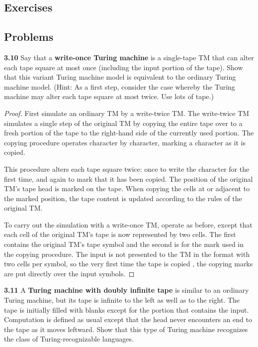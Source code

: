 \subsection{Exercises}

\subsection{Problems}
\textbf{3.10} Say that a \textbf{write-once Turing machine} is a single-tape TM that can alter each tape square at most once (including the input portion of the tape). Show that this variant Turing machine model is equivalent to the ordinary Turing machine model. (Hint: As a first step, consider the case whereby the Turing machine may alter each tape square at most twice. Use lots of tape.)
\begin{mdframed}
\begin{proof}
First simulate an ordinary TM by a write-twice TM. The write-twice TM simulates a single step of the original TM by copying the entire tape over to a fresh portion of the tape to the right-hand side of the currently used portion. The copying procedure operates character by character, marking a character as it is copied.

This procedure alters each tape square twice: once to write the character for the first time, and again to mark that it has been copied. The position of the original TM's tape head is marked on the tape. When copying the cells at or adjacent to the marked position, the tape content is updated according to the rules of the original TM.

\medskip
To carry out the simulation with a write-once TM, operate as before, except that each cell of the original TM's tape is now represented by two cells. The first contains the original TM's tape symbol and the second is for the mark used in the copying procedure. The input is not presented to the TM in the format with two cells per symbol, so the very first time the tape is copied , the copying marks are put directly over the input symbols.
\end{proof}
\end{mdframed}

\textbf{3.11}  A \textbf{Turing machine with doubly infinite tape} is similar to an ordinary Turing machine, but its tape is infinite to the left as well as to the right. The tape is initially filled with blanks except for the portion that contains the input. Computation is defined as usual except that the head never encounters an end to the tape as it moves leftward. Show that this type of Turing machine recognizes the class of Turing-recognizable languages.

